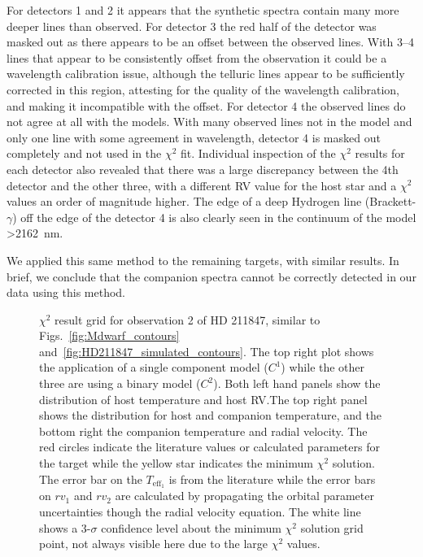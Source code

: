 For detectors 1 and 2 it appears that the synthetic spectra contain many more deeper lines than observed. For detector 3 the red half of the detector was masked out as there appears to be an offset between the observed lines. With 3--4 lines that appear to be consistently offset from the observation it could be a wavelength calibration issue, although the telluric lines appear to be sufficiently corrected in this region, attesting for the quality of the wavelength calibration, and making it incompatible with the offset. For detector 4 the observed lines do not agree at all with the models. With many observed lines not in the model and only one line with some agreement in wavelength, detector 4 is masked out completely and not used in the \(\chi^2\) fit. Individual inspection of the \(\chi^2\) results for each detector also revealed that there was a large discrepancy between the 4th detector and the other three, with a different RV value for the host star and a \(\chi^2\) values an order of magnitude higher. The edge of a deep Hydrogen line (Brackett-\(\gamma\)) off the edge of the detector 4 is also clearly seen in the continuum of the model >2162~nm. 

We applied this same method to the remaining targets, with similar results. In brief, we conclude that the companion spectra cannot be correctly detected in our data using this method.
\begin{figure*}
    \centering
    \caption{\(\chi^2\) result grid for observation 2 of {HD 211847}, similar to Figs.~\ref{fig:Mdwarf_contours} and~\ref{fig:HD211847_simulated_contours}. The top right plot shows the application of a single component model (\(C^1\)) while the other three are using a binary model (\(C^2\)). Both left hand panels show the distribution of host temperature and host RV.\@ The top right panel shows the distribution for host and companion temperature, and the bottom right the companion temperature and radial velocity. The red circles indicate the literature values or calculated parameters for the target while the yellow star indicates the minimum \(\chi^2\) solution. The error bar on the \(T_{\textrm{eff}_1}\) is from the literature while the error bars on \({rv}_1\) and \({rv}_2\) are calculated by propagating the orbital parameter uncertainties though the radial velocity equation. The white line shows a 3-\(\sigma\) confidence level about the minimum \(\chi^2\) solution grid point, not always visible here due to the large \(\chi^2\) values.}
    \label{fig:HD211847_result_contours}
\end{figure*}


